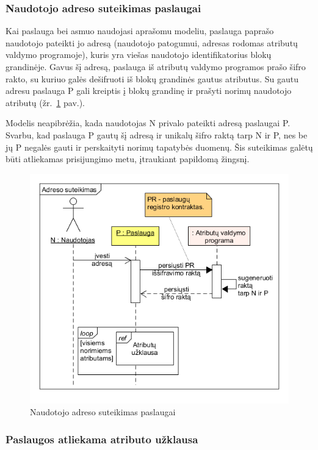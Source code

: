 \subsubsection{Naudotojo adreso suteikimas paslaugai}

Kai paslauga bei asmuo naudojasi aprašomu modeliu, paslauga paprašo naudotojo pateikti jo adresą (naudotojo patogumui, adresas rodomas
atributų valdymo programoje),
kuris yra viešas naudotojo identifikatorius blokų grandinėje.
Gavus šį adresą, paslauga iš atributų valdymo programos prašo šifro rakto, su kuriuo galės dešifruoti iš blokų grandinės gautus atributus.
Su gautu adresu paslauga P gali kreiptis į blokų grandinę ir prašyti norimų naudotojo atributų (žr.\hypertarget{fig:userGivesAddress}{~\ref{fig:userGivesAddress} pav.}).

Modelis neapibrėžia, kada naudotojas N privalo pateikti adresą paslaugai P. Svarbu, kad paslauga P gautų šį adresą ir unikalų šifro raktą tarp N ir P,
nes be jų P negalės gauti ir perskaityti norimų tapatybės duomenų. Šis suteikimas galėtų būti atliekamas prisijungimo metu, įtraukiant
papildomą žingsnį.

\begin{figure}[H]
    \centering
    \includegraphics[scale=0.6]{img/userGivesAddress}
    \caption{Naudotojo adreso suteikimas paslaugai}
    \label{fig:userGivesAddress}
\end{figure}

\subsubsection{Paslaugos atliekama atributo užklausa} \label{BCIDM:askForAttribute}

